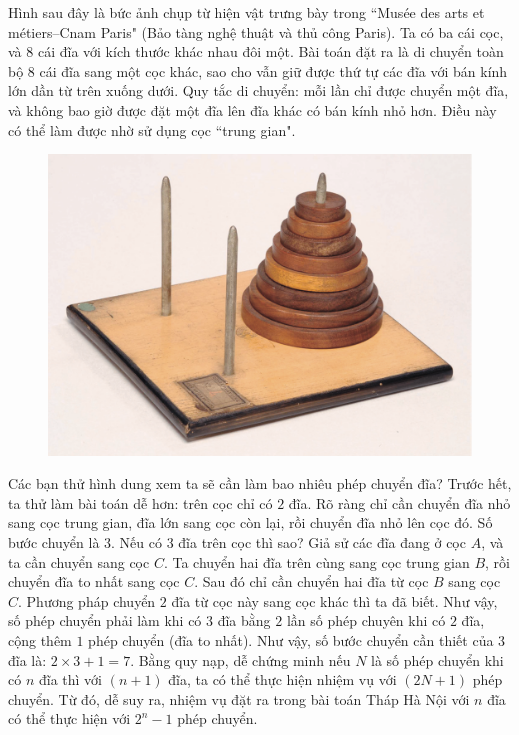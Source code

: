 \begin{multicols}{2}
	\vskip 0.1cm
	Hình sau đây là bức ảnh chụp từ hiện vật trưng bày trong ``Musée des arts et métiers--Cnam Paris" (Bảo tàng nghệ thuật và thủ công Paris). 
	\vskip 0.1cm
	Ta có ba cái cọc, và  $8$ cái đĩa với kích thước khác nhau đôi một. Bài toán đặt ra là di chuyển toàn bộ $8$ cái đĩa sang một cọc khác, sao cho vẫn giữ được thứ tự các đĩa với bán kính lớn dần từ trên xuống dưới. Quy tắc di chuyển: mỗi lần chỉ được chuyển một đĩa, và không bao giờ được đặt một đĩa lên đĩa khác có bán kính nhỏ hơn. Điều này có thể làm được nhờ sử dụng cọc ``trung gian".
	\begin{figure}[H]
		\centering
		\vspace*{5pt}
		\captionsetup{labelformat= empty, justification=centering}
		\includegraphics[width=1\linewidth]{2.1}
		\vspace*{-15pt} 
	\end{figure}
	Các bạn thử hình dung xem ta sẽ cần làm bao nhiêu phép chuyển đĩa?
	\vskip 0.1cm
	Trước hết, ta thử làm bài toán dễ hơn: trên cọc chỉ có $2$ đĩa. Rõ ràng chỉ cần chuyển đĩa nhỏ sang cọc trung gian, đĩa lớn sang cọc còn lại, rồi chuyển đĩa nhỏ lên cọc đó. Số bước chuyển là $3$.
	\vskip 0.1cm
	Nếu có $3$ đĩa trên cọc thì sao? Giả sử các đĩa đang ở cọc $A$, và ta cần chuyển sang cọc $C$. Ta chuyển hai đĩa trên cùng sang cọc  trung gian $B$, rồi chuyển đĩa to nhất sang cọc $C$. Sau đó chỉ cần chuyển hai đĩa từ cọc $B$ sang cọc $C$. Phương pháp chuyển $2$ đĩa từ cọc này sang cọc khác thì ta đã biết. Như vậy, số phép chuyển phải làm khi có $3$ đĩa bằng $2$ lần số phép chuyên khi có $2$ đĩa, cộng thêm $1$ phép chuyển (đĩa to nhất). 
	\vskip 0.1cm
	Như vậy, số bước chuyển cần thiết của $3$ đĩa là: $2\times 3 + 1 = 7$. Bằng quy nạp, dễ chứng minh nếu $N$ là số phép chuyển khi có $n$ đĩa thì với $(n+1)$ đĩa, ta có thể thực hiện nhiệm vụ với $(2N+1)$ phép chuyển. Từ đó, dễ suy ra, nhiệm vụ đặt ra trong bài toán Tháp Hà Nội với $n$ đĩa có thể thực hiện với $2^n- 1$  phép chuyển.

\end{multicols}
